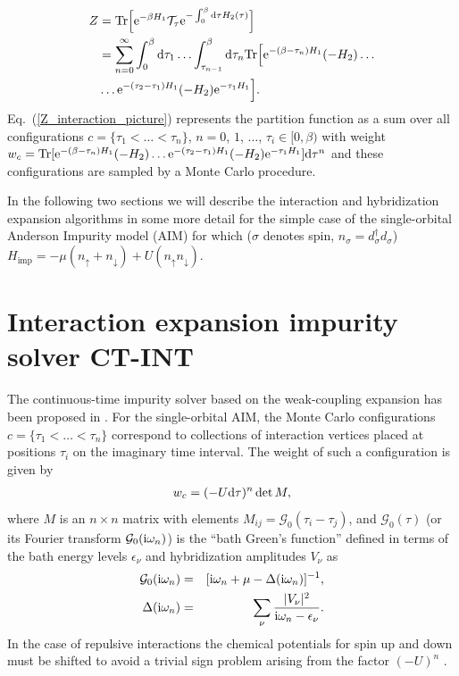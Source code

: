 \documentclass[3p,twocolumn]{elsarticle}
\begin{document}
%
\begin{align}
Z&=\text{Tr} \Big[{\rm e}^{-\beta H_1} \mathcal{T}_{\tau}{\rm e}^{-\int_0^\beta {\rm d}\tau H_2(\tau)} \Big]\nonumber\\
&=\sum_{n=0}^\infty \int_0^\beta {\rm d}\tau_1\ldots \int_{\tau_{n-1}}^\beta {\rm d}\tau_n \text{Tr}\Big[ {\rm e}^{-(\beta-\tau_n)H_1}(-H_2) \ldots \nonumber \\
&\ldots {\rm e}^{-(\tau_2-\tau_1)H_1}(-H_2){\rm e}^{-\tau_1H_1}\Big].
\label{Z_interaction_picture}
\end{align}
%
Eq.~(\ref{Z_interaction_picture}) represents the partition function as a sum over all configurations $c=\{\tau_1<\ldots<\tau_n\}$, $n=0$, $1$, $\ldots$, $\tau_i\in[0,\beta)$ with weight
$w_c=\text{Tr}[ {\rm e}^{-(\beta-\tau_n)H_1}(-H_2)\ldots {\rm e}^{-(\tau_2-\tau_1)H_1}(-H_2){\rm e}^{-\tau_1H_1}]{\rm d}
\tau^n$ and these configurations are sampled by a Monte Carlo procedure.  

In the following two sections we will describe the interaction and hybridization expansion algorithms in some more detail for the simple case of the single-orbital Anderson Impurity model (AIM) for which ($\sigma$ denotes spin, $n_\sigma=d^\dagger_\sigma d_\sigma$) $H_\text{imp}=-\mu (n_\uparrow+n_\downarrow)+U(n_\uparrow n_\downarrow)$.

\section{Interaction expansion impurity solver CT-INT}
\label{ctint_sec}
The continuous-time impurity solver based on the weak-coupling expansion has been proposed in \cite{Rubtsov05, 
Rubtsov04}. For the single-orbital AIM, the Monte Carlo configurations $c=\{\tau_1<\ldots<\tau_n\}$ correspond to collections of interaction vertices placed at positions $\tau_i$ on the imaginary time interval. The weight of such a configuration is given by 
%
\begin{align}
w_c=(-U{\rm d}\tau)^n \det M,
\end{align}
%
where $M$ is an $n\times n$ matrix with elements $M_{ij}=\mathcal{G}_0(\tau_i-\tau_j)$, and $\mathcal{G}_0(\tau)$ (or its Fourier transform $\mathcal{G}_0({\rm i}\omega_n)$) is the ``bath Green's function'' defined in terms of the bath energy levels $\epsilon_\nu$ and hybridization amplitudes $V_\nu$ as \cite{Georges96}
%
\begin{eqnarray}
\mathcal{G}_0({\rm i}\omega_n) &=& [{\rm i}\omega_n+\mu-\Delta({\rm i}\omega_n)]^{-1},\label{eq:g0}\\
\Delta({\rm i}\omega_n) &=& \sum_\nu \frac{|V_\nu|^2}{{\rm i}\omega_n-\epsilon_\nu}\label{eq:hyb}.
\end{eqnarray}
%
In the case of repulsive interactions the chemical potentials for spin up and down must be shifted to avoid a trivial sign problem arising from the factor $(-U)^n$ \cite{Rubtsov05}.
\end{document}
